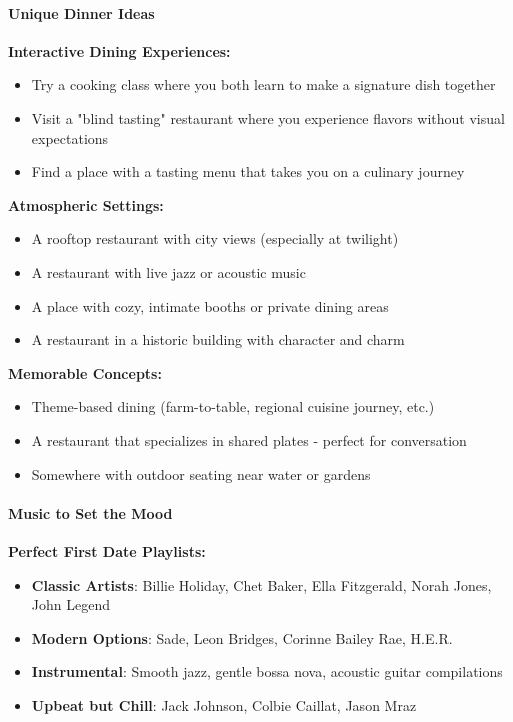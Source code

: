 \begin{persistbenchsample}[title={GLM-4.7 -- Partitioned -> Cos Similarity Partitioned -- Sample 2 (+4 Improvement)}]
\paragraph{Unique Dinner Ideas}
\textbf{Interactive Dining Experiences:}

\begin{itemize}
  \item Try a cooking class where you both learn to make a signature dish together
  \item Visit a "blind tasting" restaurant where you experience flavors without visual expectations
  \item Find a place with a tasting menu that takes you on a culinary journey
\end{itemize}

\textbf{Atmospheric Settings:}

\begin{itemize}
  \item A rooftop restaurant with city views (especially at twilight)
  \item A restaurant with live jazz or acoustic music
  \item A place with cozy, intimate booths or private dining areas
  \item A restaurant in a historic building with character and charm
\end{itemize}

\textbf{Memorable Concepts:}

\begin{itemize}
  \item Theme-based dining (farm-to-table, regional cuisine journey, etc.)
  \item A restaurant that specializes in shared plates - perfect for conversation
  \item Somewhere with outdoor seating near water or gardens
\end{itemize}

\paragraph{Music to Set the Mood}
\textbf{Perfect First Date Playlists:}

\begin{itemize}
  \item \textbf{Classic Artists}: Billie Holiday, Chet Baker, Ella Fitzgerald, Norah Jones, John Legend
  \item \textbf{Modern Options}: Sade, Leon Bridges, Corinne Bailey Rae, H.E.R.
  \item \textbf{Instrumental}: Smooth jazz, gentle bossa nova, acoustic guitar compilations
  \item \textbf{Upbeat but Chill}: Jack Johnson, Colbie Caillat, Jason Mraz
\end{itemize}


\end{persistbenchsample}
